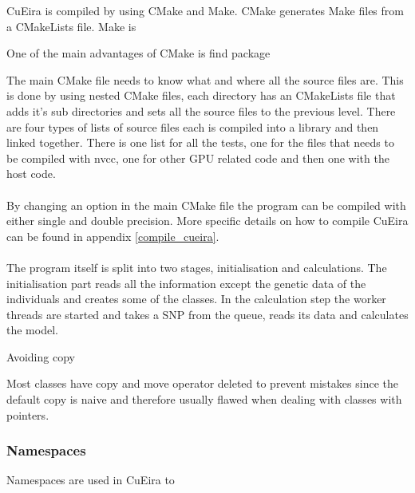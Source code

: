 \documentclass[10pt,a4paper]{report}
\begin{document}
CuEira is compiled by using CMake and Make. CMake generates Make files from a CMakeLists file. Make is 

One of the main advantages of CMake is 
find package

The main CMake file needs to know what and where all the source files are. This is done by using nested CMake files, each directory has an CMakeLists file that adds it's sub directories and sets all the source files to the previous level. There are four types of lists of source files each is compiled into a library and then linked together. There is one list for all the tests, one for the files that needs to be compiled with nvcc, one for other GPU related code and then one with the host code.\\
\\
By changing an option in the main CMake file the program can be compiled with either single and double precision. More specific details on how to compile CuEira can be found in appendix \ref{compile_cueira}.\\ %
\\
The program itself is split into two stages, initialisation and calculations. The initialisation part reads all the information except the genetic data of the individuals and creates some of the classes. In the calculation step the worker threads are started and takes a SNP from the queue, reads its data and calculates the model.

Avoiding copy

Most classes have copy and move operator deleted to prevent mistakes since the default copy is naive and therefore usually flawed when dealing with classes with pointers.

\subsubsection{Namespaces}
Namespaces are used in CuEira to 
\end{document}
